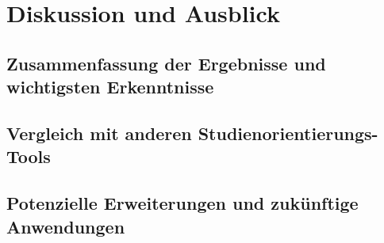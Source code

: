 \section{Diskussion und Ausblick}

\subsection{Zusammenfassung der Ergebnisse und wichtigsten Erkenntnisse}

\subsection{Vergleich mit anderen Studienorientierungs-Tools}

\subsection{Potenzielle Erweiterungen und zukünftige Anwendungen}